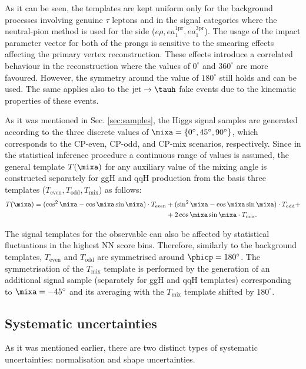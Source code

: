 As it can be seen, the templates are kept uniform only for the background processes involving genuine $\tau$ leptons and in the signal categories where the neutral-pion method is used for the \tauh side ($e\rho, e a_1^\text{1pr}, e a_1^\text{3pr}$). The usage of the impact parameter vector for both of the prongs is sensitive to the smearing effects affecting the primary vertex reconstruction. These effects introduce a correlated behaviour in the \phicp reconstruction where the \phicp values of $0^\circ$ and $360^\circ$ are more favoured. However, the symmetry around the \phicp value of $180^\circ$ still holds and can be used. The same applies also to the $\text{jet} \to \tauh$ fake events due to the kinematic properties of these events.

As it was mentioned in Sec. \ref{sec:samples}, the Higgs signal samples are generated according to the three discrete values of $\mixa = \{0^\circ, 45^\circ, 90^\circ\}$, which corresponds to the CP-even, CP-odd, and CP-mix scenarios, respectively. Since in the statistical inference procedure a continuous range of \mixa values is assumed, the general template $T(\mixa)$ for any auxiliary value of the mixing angle is constructed separately for ggH and qqH production from the basis three templates ($T_\text{even}, T_\text{odd}, T_\text{mix}$) as follows:
\begin{align*}
    T(\mixa) = (\cos^2\mixa - \cos\mixa\sin\mixa) \cdot T_\text{even} &+ (\sin^2\mixa - \cos\mixa\sin\mixa) \cdot T_\text{odd} + \\
    &+ 2\cos\mixa\sin\mixa \cdot T_\text{mix}.
\end{align*}

The signal templates for the \phicp observable can also be affected by statistical fluctuations in the highest NN score bins. Therefore, similarly to the background templates, $T_\text{even}$ and $T_\text{odd}$ are symmetrised around $\phicp=180^\circ$. The symmetrisation of the $T_\text{mix}$ template is performed by the generation of an additional signal sample (separately for ggH and qqH templates) corresponding to $\mixa = -45^\circ$ and its averaging with the $T_\text{mix}$ template shifted by $180^\circ$. 

\subsection{Systematic uncertainties}\label{sec:syst}
As it was mentioned earlier, there are two distinct types of systematic uncertainties: normalisation and shape uncertainties. 


